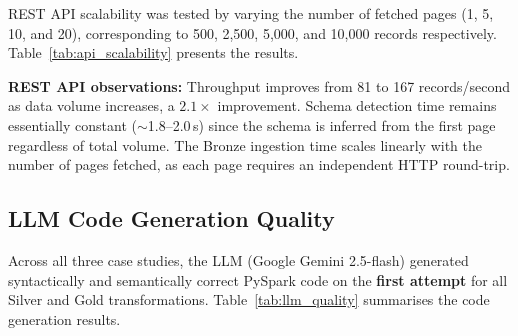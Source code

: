 REST API scalability was tested by varying the number of fetched pages (1, 5, 10, and 20), corresponding to 500, 2,500, 5,000, and 10,000 records respectively. Table~\ref{tab:api_scalability} presents the results.

\begin{table}[ht]
\centering
\caption{REST API scalability across data volumes (mean $\pm$ std, N=10)}
\label{tab:api_scalability}
\end{table}

\textbf{REST API observations:} Throughput improves from 81 to 167 records/second as data volume increases, a $2.1\times$ improvement. Schema detection time remains essentially constant ($\sim$1.8--2.0\,s) since the schema is inferred from the first page regardless of total volume. The Bronze ingestion time scales linearly with the number of pages fetched, as each page requires an independent HTTP round-trip.



\subsection{LLM Code Generation Quality}

Across all three case studies, the LLM (Google Gemini 2.5-flash) generated syntactically and semantically correct PySpark code on the \textbf{first attempt} for all Silver and Gold transformations. Table~\ref{tab:llm_quality} summarises the code generation results.

